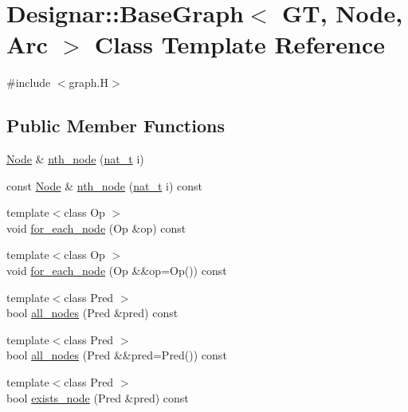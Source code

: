 \hypertarget{class_designar_1_1_base_graph}{}\section{Designar\+:\+:Base\+Graph$<$ GT, Node, Arc $>$ Class Template Reference}
\label{class_designar_1_1_base_graph}


{\ttfamily \#include $<$graph.\+H$>$}

\subsection*{Public Member Functions}
\begin{DoxyCompactItemize}
\item 
\hyperlink{namespace_designar_a5af326c65aa2bd26b26c410f2030d09e}{Node} \& \hyperlink{class_designar_1_1_base_graph_ae71b167fa33e8233cac2807d7c9e8930}{nth\+\_\+node} (\hyperlink{namespace_designar_aa72662848b9f4815e7bf31a7cf3e33d1}{nat\+\_\+t} i)
\item 
const \hyperlink{namespace_designar_a5af326c65aa2bd26b26c410f2030d09e}{Node} \& \hyperlink{class_designar_1_1_base_graph_aef085a54ee983b91ace1cbbe902bc28b}{nth\+\_\+node} (\hyperlink{namespace_designar_aa72662848b9f4815e7bf31a7cf3e33d1}{nat\+\_\+t} i) const
\item 
{\footnotesize template$<$class Op $>$ }\\void \hyperlink{class_designar_1_1_base_graph_a9497531ac221edb5c5ef19888f78ad3c}{for\+\_\+each\+\_\+node} (Op \&op) const
\item 
{\footnotesize template$<$class Op $>$ }\\void \hyperlink{class_designar_1_1_base_graph_aab8f765719514803f426b03939f519a1}{for\+\_\+each\+\_\+node} (Op \&\&op=Op()) const
\item 
{\footnotesize template$<$class Pred $>$ }\\bool \hyperlink{class_designar_1_1_base_graph_abad9513273c1096aba652e211180061c}{all\+\_\+nodes} (Pred \&pred) const
\item 
{\footnotesize template$<$class Pred $>$ }\\bool \hyperlink{class_designar_1_1_base_graph_a32419ec17712a60c1964bc91e78d135c}{all\+\_\+nodes} (Pred \&\&pred=Pred()) const
\item 
{\footnotesize template$<$class Pred $>$ }\\bool \hyperlink{class_designar_1_1_base_graph_a3631470de61b819211c72fdd2ac31b34}{exists\+\_\+node} (Pred \&pred) const

\end{DoxyCompactItemize}
